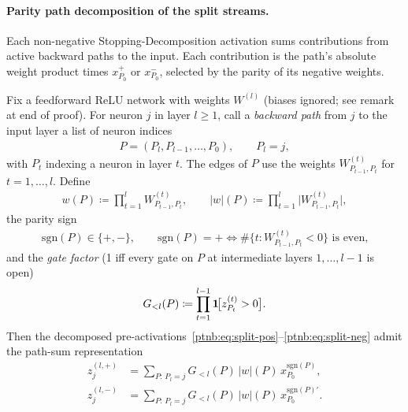 \paragraph{Parity path decomposition of the split streams.}\label{ptnb:app:parity-path}
Each non-negative Stopping-Decomposition activation sums contributions from active backward paths
to the input. Each contribution is the path's absolute weight product times $x_{P_0}^+$ or
$x_{P_0}^-$, selected by the parity of its negative weights.

\begin{lemmaenv}\label{ptnb:lem:parity-path}
Fix a feedforward ReLU network with weights $W^{(l)}$ (biases ignored; see remark at end of proof).
For neuron $j$ in layer $l \ge 1$, call a \emph{backward path} from $j$ to the input layer a list
of neuron indices
\begin{align}
    P = (P_l, P_{l-1}, \dots, P_0), \qquad P_l = j,
\end{align}
with $P_t$ indexing a neuron in layer $t$. The edges of $P$ use the weights $W^{(t)}_{P_{t-1},
    P_t}$ for $t = 1, \dots, l$. Define
\begin{align}
    w(P) \coloneqq \prod_{t=1}^{l} W^{(t)}_{P_{t-1}, P_t},
    \qquad
    |w|(P) \coloneqq \prod_{t=1}^{l} \bigl| W^{(t)}_{P_{t-1}, P_t} \bigr|,
\end{align}
the parity sign
\begin{align}
    \mathrm{sgn}(P) \in \{+,-\},
    \qquad
    \mathrm{sgn}(P) = + \iff \#\bigl\{t : W^{(t)}_{P_{t-1}, P_t} < 0\bigr\} \text{ is even,}
\end{align}
and the \emph{gate factor} (1 iff every gate on $P$ at intermediate layers $1,\dots,l-1$ is open)
\begin{align}
    G_{<l}(P) \coloneqq \prod_{t=1}^{l-1} \mathbf{1}\!\bigl[z_{P_t}^{(t)} > 0\bigr].
\end{align}
Then the decomposed pre-activations~\eqref{ptnb:eq:split-pos}--\eqref{ptnb:eq:split-neg} admit the path-sum
representation
\begin{align}
    z_j^{(l,+)} &= \sum_{P:\, P_l = j} G_{<l}(P)\, |w|(P)\, x_{P_0}^{\mathrm{sgn}(P)},
    \label{ptnb:eq:parity-plus}\\
    z_j^{(l,-)} &= \sum_{P:\, P_l = j} G_{<l}(P)\, |w|(P)\, x_{P_0}^{\mathrm{sgn}(P)'}.
    \label{ptnb:eq:parity-minus}
\end{align}\end{lemmaenv}

